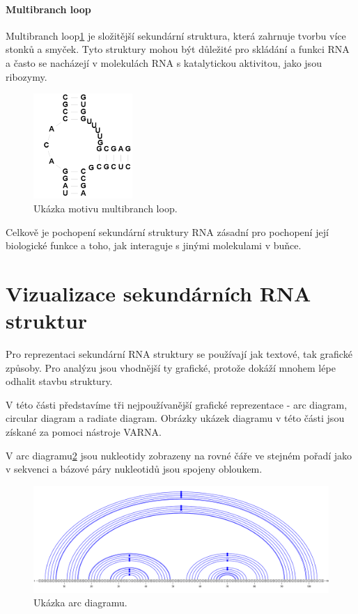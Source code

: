 \paragraph{Multibranch loop}

\sloppy

Multibranch loop\ref{multibranch} je složitější sekundární struktura, která
zahrnuje tvorbu více stonků a smyček. Tyto struktury mohou být důležité pro
skládání a funkci RNA a často se nacházejí v molekulách RNA s katalytickou
aktivitou, jako jsou ribozymy.

\fussy

\begin{figure}[H]
  \centering
  \includegraphics[height=40mm]{../img/kap01/rna/multibranch.png}
  \caption[Ukázka motivu multibranch loop]{Ukázka motivu multibranch loop.}
  \label{multibranch}
\end{figure}

Celkově je pochopení sekundární struktury RNA zásadní pro pochopení její
biologické funkce a toho, jak interaguje s jinými molekulami v buňce.

\section{Vizualizace sekundárních RNA struktur} 

Pro reprezentaci sekundární RNA struktury se používají jak textové, tak
grafické způsoby. Pro analýzu jsou vhodnější ty grafické, protože dokáží mnohem
lépe odhalit stavbu struktury.

V této části představíme tři nejpoužívanější grafické reprezentace - arc
diagram, circular diagram a radiate diagram. Obrázky ukázek diagramu v této
části jsou získané za pomoci nástroje VARNA\cite{Varna}.

V arc diagramu\ref{arc} jsou nukleotidy zobrazeny na rovné čáře ve stejném pořadí jako v
sekvenci a bázové páry nukleotidů jsou spojeny obloukem.

\begin{figure}[H]
  \centering
  \includegraphics[width=140mm]{../img/kap01/diagrams/arc.png}
  \caption[Ukázka arc diagramu]{Ukázka arc diagramu.}
  \label{arc}
\end{figure}

